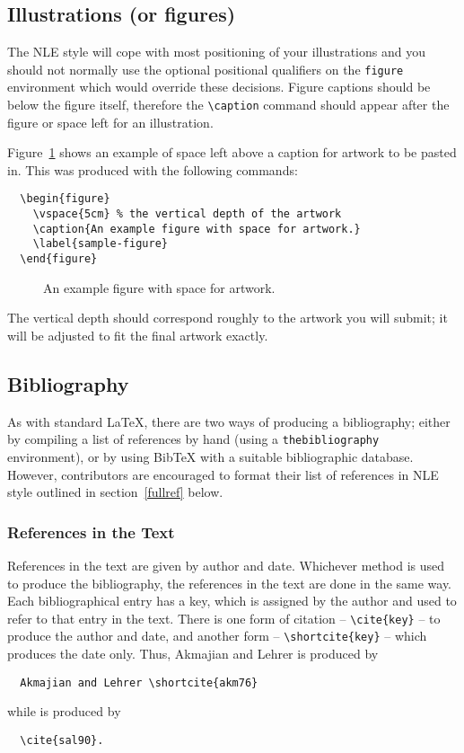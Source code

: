 \documentclass{cnle}
\begin{document}
\subsection{Illustrations (or figures)}

The NLE style will cope with most positioning of your illustrations
and you should not normally use the optional positional qualifiers on
the \verb"figure" environment which would override these decisions.
Figure captions should be below the figure itself, therefore the \verb"\caption"
command should appear after the figure or space left for an illustration.

Figure~\ref{sample-figure} shows an example of space left above a
caption for artwork to be pasted in. This was produced with the
following commands:
%
\begin{verbatim}
  \begin{figure}
    \vspace{5cm} % the vertical depth of the artwork
    \caption{An example figure with space for artwork.}
    \label{sample-figure}
  \end{figure}
\end{verbatim}
%
\begin{figure}
  \vspace{5cm} %
  \caption{An example figure with space for artwork.}
  \label{sample-figure}
\end{figure}
%
The vertical depth should correspond roughly to the artwork you will submit;
it will be adjusted to fit the final artwork exactly.

\subsection{Bibliography}

As with standard \LaTeX, there are two ways of producing a bibliography;
either by compiling a list of references by hand (using a
\verb"thebibliography" environment), or by using BibTeX with a suitable
bibliographic database. However, contributors are encouraged to format
their list of references in NLE style outlined in section~\ref{fullref}
below.

\subsubsection{References in the Text}

References in the text are given by author and date.
Whichever method is used to produce the bibliography, the references in
the text are done in the same way. Each bibliographical entry has a key,
which is assigned by the author and used to refer to that entry in the
text. There is one form of citation -- \verb"\cite{key}" -- to produce the
author and date, and another form -- \verb"\shortcite{key}" -- which
produces the date only. Thus,
Akmajian and Lehrer  is produced by
%
\begin{verbatim}
  Akmajian and Lehrer \shortcite{akm76}
\end{verbatim}
%
while \cite{sal90} is produced by
%
\begin{verbatim}
  \cite{sal90}.
\end{verbatim}
\end{document}
